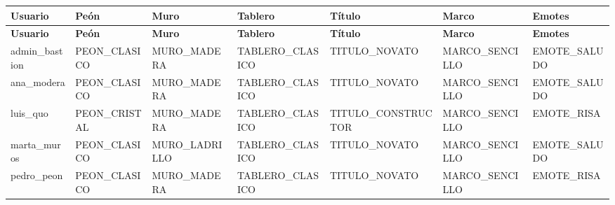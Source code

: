 \begin{center}\scriptsize\setlength{\tabcolsep}{2pt}
\begin{longtable}{|L{44.8pt}|L{54.8pt}|L{62.2pt}|L{68.4pt}|L{91.1pt}|L{63.6pt}|L{55.3pt}|}
\hline
\textbf{\hspace{0pt}Usuario} & \textbf{\hspace{0pt}Peón} & \textbf{\hspace{0pt}Muro} & \textbf{\hspace{0pt}Tablero} & \textbf{\hspace{0pt}Título} & \textbf{\hspace{0pt}Marco} & \textbf{\hspace{0pt}Emotes} \\ \hline
\endfirsthead
\hline
\textbf{\hspace{0pt}Usuario} & \textbf{\hspace{0pt}Peón} & \textbf{\hspace{0pt}Muro} & \textbf{\hspace{0pt}Tablero} & \textbf{\hspace{0pt}Título} & \textbf{\hspace{0pt}Marco} & \textbf{\hspace{0pt}Emotes} \\ \hline
\endhead
admin\_\allowbreak{}bastion & PEON\_\allowbreak{}CLASICO & MURO\_\allowbreak{}MADERA & TABLERO\_\allowbreak{}CLASICO & TITULO\_\allowbreak{}NOVATO & MARCO\_\allowbreak{}SENCILLO & EMOTE\_\allowbreak{}SALUDO \\ \hline
ana\_\allowbreak{}modera & PEON\_\allowbreak{}CLASICO & MURO\_\allowbreak{}MADERA & TABLERO\_\allowbreak{}CLASICO & TITULO\_\allowbreak{}NOVATO & MARCO\_\allowbreak{}SENCILLO & EMOTE\_\allowbreak{}SALUDO \\ \hline
luis\_\allowbreak{}quo & PEON\_\allowbreak{}CRISTAL & MURO\_\allowbreak{}MADERA & TABLERO\_\allowbreak{}CLASICO & TITULO\_\allowbreak{}CONSTRUCTOR & MARCO\_\allowbreak{}SENCILLO & EMOTE\_\allowbreak{}RISA \\ \hline
marta\_\allowbreak{}muros & PEON\_\allowbreak{}CLASICO & MURO\_\allowbreak{}LADRILLO & TABLERO\_\allowbreak{}CLASICO & TITULO\_\allowbreak{}NOVATO & MARCO\_\allowbreak{}SENCILLO & EMOTE\_\allowbreak{}SALUDO \\ \hline
pedro\_\allowbreak{}peon & PEON\_\allowbreak{}CLASICO & MURO\_\allowbreak{}MADERA & TABLERO\_\allowbreak{}CLASICO & TITULO\_\allowbreak{}NOVATO & MARCO\_\allowbreak{}SENCILLO & EMOTE\_\allowbreak{}RISA \\ \hline

\end{longtable}
\end{center}
